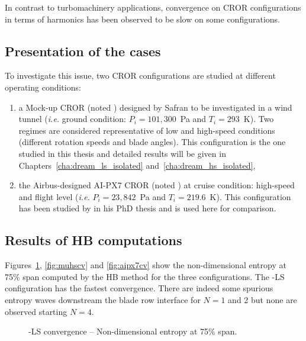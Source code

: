 
In contrast to turbomachinery applications, convergence
on CROR configurations
in terms of harmonics has been observed to be
slow on some configurations.

\subsection{Presentation of the cases}

To investigate this issue, two CROR configurations are studied at
different operating conditions:
\begin{enumerate}
\item a Mock-up CROR (noted \mockup) designed by Safran to be
  investigated in a wind tunnel (\emph{i.e.} ground condition:
  $P_i=101,300$~Pa and $T_i=293$~K). Two regimes are considered
  representative of low and high-speed conditions (different rotation
  speeds and blade angles). This configuration is the one
  studied in this thesis and detailed results will be given 
  in Chapters~\ref{cha:dream_ls_isolated} and~\ref{cha:dream_hs_isolated},
\item the Airbus-designed AI-PX7 CROR (noted \aipx) at cruise
  condition: high-speed 
  and flight level (\emph{i.e.}  $P_i=23,842$~Pa and
  $T_i=219.6$~K). This configuration has been studied by
  \citet{ThesisFrancois} in his PhD thesis and is used
  here for comparison.
\end{enumerate}

\subsection{Results of HB computations}

Figures~\ref{fig:mulscv},
\ref{fig:muhscv} and \ref{fig:aipx7cv} show the non-dimensional
entropy at 75\% span computed by the HB method for the three
configurations. The \mockup-LS configuration has the fastest
convergence. There are indeed some spurious entropy waves downstream the blade
row interface for $N=1$ and 2 but none are observed
starting $N=4$.
\begin{figure}[htb]
  \centering
  \caption{\mockup-LS convergence -- Non-dimensional entropy at 75\% span.}
  \label{fig:mulscv}
\end{figure}

